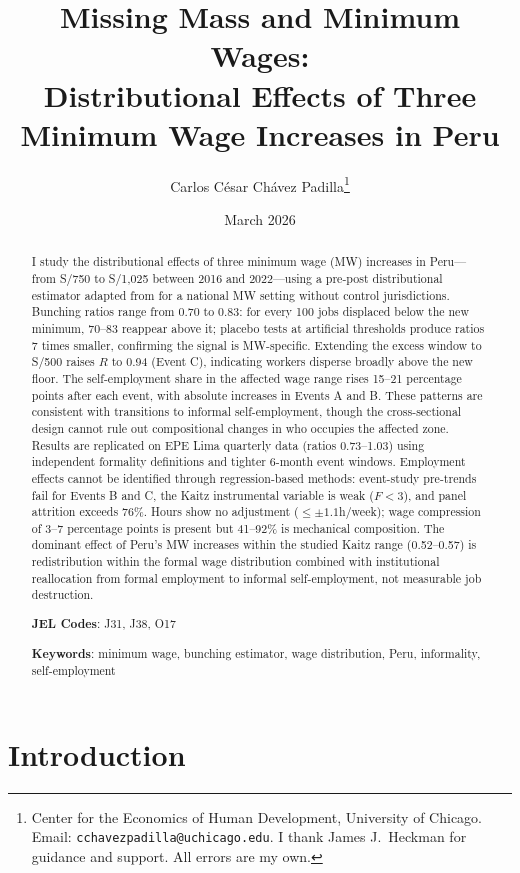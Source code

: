\documentclass[12pt]{article}
\title{\textbf{Missing Mass and Minimum Wages:\\
Distributional Effects of Three Minimum Wage Increases in Peru}}
\author{
  Carlos C\'esar Ch\'avez Padilla\thanks{Center for the Economics of Human Development, University of Chicago. Email: \texttt{cchavezpadilla@uchicago.edu}. I thank James J.\ Heckman for guidance and support. All errors are my own.}
}
\date{March 2026}
\begin{document}
\maketitle

\begin{abstract}
\noindent
I study the distributional effects of three minimum wage (MW) increases in Peru---from S/750 to S/1,025 between 2016 and 2022---using a pre-post distributional estimator adapted from \citet{cengiz2019} for a national MW setting without control jurisdictions. Bunching ratios range from 0.70 to 0.83: for every 100 jobs displaced below the new minimum, 70--83 reappear above it; placebo tests at artificial thresholds produce ratios 7 times smaller, confirming the signal is MW-specific. Extending the excess window to S/500 raises $R$ to 0.94 (Event C), indicating workers disperse broadly above the new floor. The self-employment share in the affected wage range rises 15--21 percentage points after each event, with absolute increases in Events A and B. These patterns are consistent with transitions to informal self-employment, though the cross-sectional design cannot rule out compositional changes in who occupies the affected zone. Results are replicated on EPE Lima quarterly data (ratios 0.73--1.03) using independent formality definitions and tighter 6-month event windows. Employment effects cannot be identified through regression-based methods: event-study pre-trends fail for Events B and C, the Kaitz instrumental variable is weak ($F < 3$), and panel attrition exceeds 76\%. Hours show no adjustment ($\leq \pm 1.1$h/week); wage compression of 3--7 percentage points is present but 41--92\% is mechanical composition. The dominant effect of Peru's MW increases within the studied Kaitz range (0.52--0.57) is redistribution within the formal wage distribution combined with institutional reallocation from formal employment to informal self-employment, not measurable job destruction.

\medskip
\noindent\textbf{JEL Codes}: J31, J38, O17

\noindent\textbf{Keywords}: minimum wage, bunching estimator, wage distribution, Peru, informality, self-employment
\end{abstract}

\newpage
\tableofcontents
\newpage

\section{Introduction}\label{sec:intro}
\end{document}
